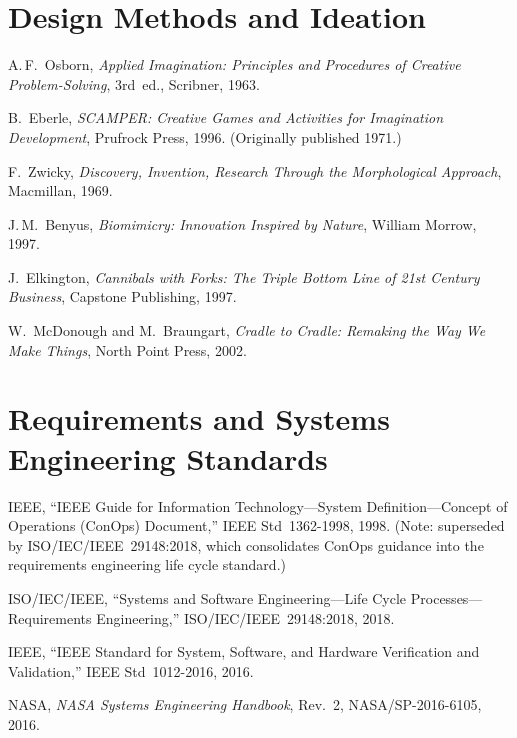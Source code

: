 \section*{Design Methods and Ideation}
\begin{enumerate}[label={[\arabic*]},leftmargin=2em,resume]
\item A.\,F.~Osborn, \emph{Applied Imagination: Principles and Procedures of Creative Problem-Solving}, 3rd~ed., Scribner, 1963.
\item B.~Eberle, \emph{SCAMPER: Creative Games and Activities for Imagination Development}, Prufrock Press, 1996. (Originally published 1971.)
\item F.~Zwicky, \emph{Discovery, Invention, Research Through the Morphological Approach}, Macmillan, 1969.
\item J.\,M.~Benyus, \emph{Biomimicry: Innovation Inspired by Nature}, William Morrow, 1997.
\item J.~Elkington, \emph{Cannibals with Forks: The Triple Bottom Line of 21st Century Business}, Capstone Publishing, 1997.
\item W.~McDonough and M.~Braungart, \emph{Cradle to Cradle: Remaking the Way We Make Things}, North Point Press, 2002.
\end{enumerate}

\section*{Requirements and Systems Engineering Standards}
\begin{enumerate}[label={[\arabic*]},leftmargin=2em,resume]
\item IEEE, ``IEEE Guide for Information Technology---System Definition---Concept of Operations (ConOps) Document,'' IEEE Std~1362-1998, 1998. (Note: superseded by ISO/IEC/IEEE~29148:2018, which consolidates ConOps guidance into the requirements engineering life cycle standard.)
\item ISO/IEC/IEEE, ``Systems and Software Engineering---Life Cycle Processes---Requirements Engineering,'' ISO/IEC/IEEE~29148:2018, 2018.
\item IEEE, ``IEEE Standard for System, Software, and Hardware Verification and Validation,'' IEEE Std~1012-2016, 2016.
\item NASA, \emph{NASA Systems Engineering Handbook}, Rev.~2, NASA/SP-2016-6105, 2016.
\end{enumerate}

